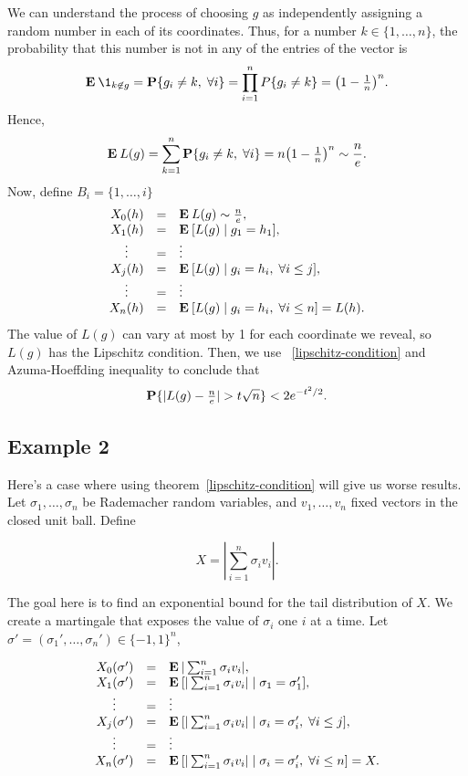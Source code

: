 We can understand the process of choosing $g$ as independently assigning a random number in each of its coordinates. Thus, for a number $k \in \{1,\ldots, n\}$, the probability that this number is not in any of the entries of the vector is
\[\E \1_{k \not\in g} = \P\{g_i \neq k, \; \forall i\} = \prod_{i = 1}^n P\{g_i \neq k\} = {\left(1-\tfrac{1}{n}\right)}^n. \] 
Hence,
\[ \E L(g) = \sum_{k = 1}^n \P\{g_i \neq k, \; \forall i\} = n {\left(1-\tfrac{1}{n}\right)}^n \sim \frac{n}{e}. \] 
Now, define $B_i = \{1, \ldots, i\}$
\[\begin{array}{rcl}
    X_0(h) & = & \E L(g) \sim \frac{n}{e},\\
    X_1(h) & = & \E [ L(g) \;|\; g_1 = h_1 ], \\
    \hfill\vdots\hfill & = & \vdots \\
    X_j(h) & = & \E [L(g) \;|\; g_i = h_i,\; \forall i\leq j ],\\
    \hfill\vdots\hfill & = & \vdots \\
    X_n(h) & = & \E [L(g) \;|\; g_i = h_i,\; \forall i\leq n] = L(h).
\end{array} \] 
The value of $L(g)$ can vary at most by 1 for each coordinate we reveal, so $L(g)$ has the Lipschitz condition. Then, we use ~\ref{lipschitz-condition} and Azuma-Hoeffding inequality to conclude that
\[ \P\{|L(g) - \tfrac{n}{e}| > t\sqrt{n}\} < 2e^{-t^2 / 2}. \] 

\subsection*{Example 2}
Here's a case where using {theorem}~\ref{lipschitz-condition} will give us worse results. Let $\sigma_1,\ldots, \sigma_n$ be Rademacher random variables, and $v_1,\ldots, v_n$ fixed vectors in the closed unit ball. Define

\[ X = \left| \sum_{i = 1}^n \sigma_i v_i \right|.\]

The goal here is to find an exponential bound for the tail distribution of $X$. We create a martingale that exposes the value of $\sigma_i$ one $i$ at a time. Let $\sigma' = (\sigma_1',\ldots, \sigma_n') \in {\{-1,1\}}^n$,

\[\begin{array}{rcl}
    X_0(\sigma') & = & \E |\sum_{i = 1}^n \sigma_i v_i|,\\
    X_1(\sigma') & = & \E [ |\sum_{i = 1}^n \sigma_i v_i| \;|\; \sigma_1 = \sigma_1' ], \\
    \hfill\vdots\hfill & = & \vdots \\
    X_j(\sigma') & = & \E [|\sum_{i = 1}^n \sigma_i v_i| \;|\; \sigma_i = \sigma_i',\; \forall i\leq j ],\\
    \hfill\vdots\hfill & = & \vdots \\
    X_n(\sigma') & = & \E [|\sum_{i = 1}^n \sigma_i v_i| \;|\; \sigma_i = \sigma_i',\; \forall i\leq n] = X.
\end{array} \]

